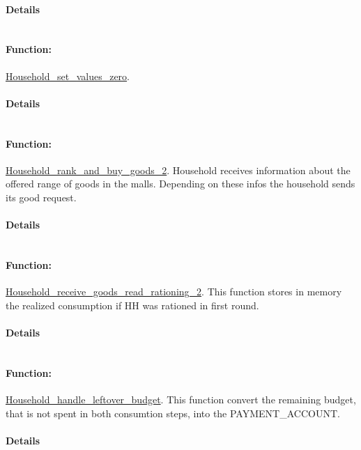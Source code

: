 \documentclass[a4paper,11pt]{article}
\begin{document}
\paragraph{Details}
\begin{verbatim}
\end{verbatim}
\paragraph{Function:}\url{Household_set_values_zero}.

\paragraph{Details}
\begin{verbatim}
\end{verbatim}
\paragraph{Function:}\url{Household_rank_and_buy_goods_2}.
Household receives information about the offered range 
of goods in the malls. Depending on these infos the household 
sends its good request.
\paragraph{Details}
\begin{verbatim}
\end{verbatim}
\paragraph{Function:}\url{Household_receive_goods_read_rationing_2}.
This function stores in memory the realized consumption if HH was rationed in first round. 
\paragraph{Details}
\begin{verbatim}
\end{verbatim}
\paragraph{Function:}\url{Household_handle_leftover_budget}.
This function convert the remaining budget, that is not 
spent in both consumtion steps, into the PAYMENT\_ACCOUNT.
\paragraph{Details}
\begin{verbatim}
\end{verbatim}
\end{document}
